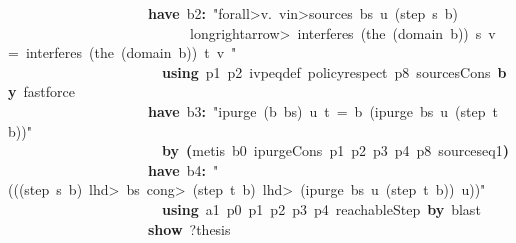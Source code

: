 \documentclass{article}
\newcommand{\syntaxKEYWORDA}[1]{\textcolor[rgb]{0.0,0.4,0.6}{\textbf{#1}}}
\newcommand{\syntaxKEYWORDC}[1]{\textcolor[rgb]{0.0,0.6,1.0}{\textbf{#1}}}
\newcommand{\syntaxLITERALA}[1]{\textcolor[rgb]{1.0,0.0,0.8}{#1}}
\newcommand{\syntaxOPERATOR}[1]{\textcolor[rgb]{0.0,0.0,0.0}{\textbf{#1}}}
\newcommand{\syntaxKEYWORDA}[1]{\textcolor[rgb]{0.0,0.4,0.6}{\textbf{#1}}}
\newcommand{\syntaxKEYWORDC}[1]{\textcolor[rgb]{0.0,0.6,1.0}{\textbf{#1}}}
\newcommand{\syntaxLITERALA}[1]{\textcolor[rgb]{1.0,0.0,0.8}{#1}}
\newcommand{\syntaxOPERATOR}[1]{\textcolor[rgb]{0.0,0.0,0.0}{\textbf{#1}}}
\newcommand{\syntaxKEYWORDA}[1]{\textcolor[rgb]{0.0,0.4,0.6}{\textbf{#1}}}
\newcommand{\syntaxKEYWORDC}[1]{\textcolor[rgb]{0.0,0.6,1.0}{\textbf{#1}}}
\newcommand{\syntaxLITERALA}[1]{\textcolor[rgb]{1.0,0.0,0.8}{#1}}
\newcommand{\syntaxOPERATOR}[1]{\textcolor[rgb]{0.0,0.0,0.0}{\textbf{#1}}}
\newcommand{\syntaxKEYWORDA}[1]{\textcolor[rgb]{0.0,0.4,0.6}{#1}}
\newcommand{\syntaxKEYWORDC}[1]{\textcolor[rgb]{0.0,0.6,1.0}{#1}}
\newcommand{\syntaxLITERALA}[1]{\textcolor[rgb]{1.0,0.0,0.8}{\textbf{#1}}}
\newcommand{\syntaxOPERATOR}[1]{\textcolor[rgb]{0.0,0.0,0.0}{#1}}
\newcommand{\syntaxKEYWORDA}[1]{\textcolor[rgb]{0.0,0.4,0.6}{\textbf{#1}}}
\newcommand{\syntaxKEYWORDC}[1]{\textcolor[rgb]{0.0,0.6,1.0}{\textbf{#1}}}
\newcommand{\syntaxLITERALA}[1]{\textcolor[rgb]{1.0,0.0,0.8}{#1}}
\newcommand{\syntaxOPERATOR}[1]{\textcolor[rgb]{0.0,0.0,0.0}{\textbf{#1}}}
\newcommand{\syntaxKEYWORDA}[1]{\textcolor[rgb]{0.0,0.4,0.6}{\textbf{#1}}}
\newcommand{\syntaxKEYWORDC}[1]{\textcolor[rgb]{0.0,0.6,1.0}{\textbf{#1}}}
\newcommand{\syntaxLITERALA}[1]{\textcolor[rgb]{1.0,0.0,0.8}{#1}}
\newcommand{\syntaxOPERATOR}[1]{\textcolor[rgb]{0.0,0.0,0.0}{\textbf{#1}}}
\begin{document}
{\ }{\ }{\ }{\ }{\ }{\ }{\ }{\ }{\ }{\ }{\ }{\ }{\ }{\ }{\ }{\ }{\ }{\ }{\ }{\ }\syntaxKEYWORDA{have}{\ }b2\syntaxOPERATOR{:}{\ }\syntaxLITERALA{"\<forall>v.{\ }v\<in>sources{\ }bs{\ }u{\ }(step{\ }s{\ }b){\ }}\hspace*{\fill}\\
\syntaxLITERALA{{\ }{\ }{\ }{\ }{\ }{\ }{\ }{\ }{\ }{\ }{\ }{\ }{\ }{\ }{\ }{\ }{\ }{\ }{\ }{\ }{\ }{\ }{\ }{\ }{\ }{\ }\<longrightarrow>{\ }interferes{\ }(the{\ }(domain{\ }b)){\ }s{\ }v{\ }={\ }interferes{\ }(the{\ }(domain{\ }b)){\ }t{\ }v{\ }"}\hspace*{\fill}\\
{\ }{\ }{\ }{\ }{\ }{\ }{\ }{\ }{\ }{\ }{\ }{\ }{\ }{\ }{\ }{\ }{\ }{\ }{\ }{\ }{\ }{\ }\syntaxKEYWORDA{using}{\ }p1{\ }p2{\ }ivpeq\usebox{\underscorebox}def{\ }policy\usebox{\underscorebox}respect{\ }p8{\ }sources\usebox{\underscorebox}Cons{\ }\syntaxKEYWORDA{by}{\ }fastforce\hspace*{\fill}\\
{\ }{\ }{\ }{\ }{\ }{\ }{\ }{\ }{\ }{\ }{\ }{\ }{\ }{\ }{\ }{\ }{\ }{\ }{\ }{\ }\syntaxKEYWORDA{have}{\ }b3\syntaxOPERATOR{:}{\ }\syntaxLITERALA{"ipurge{\ }(b{\ }\usebox{\hashbox}{\ }bs){\ }u{\ }t{\ }={\ }b{\ }\usebox{\hashbox}{\ }(ipurge{\ }bs{\ }u{\ }(step{\ }t{\ }b))"}\hspace*{\fill}\\
{\ }{\ }{\ }{\ }{\ }{\ }{\ }{\ }{\ }{\ }{\ }{\ }{\ }{\ }{\ }{\ }{\ }{\ }{\ }{\ }{\ }{\ }\syntaxKEYWORDA{by}{\ }\syntaxOPERATOR{(}metis{\ }b0{\ }ipurge\usebox{\underscorebox}Cons{\ }p1{\ }p2{\ }p3{\ }p4{\ }p8{\ }sources\usebox{\underscorebox}eq1\syntaxOPERATOR{)}\hspace*{\fill}\\
{\ }{\ }{\ }{\ }{\ }{\ }{\ }{\ }{\ }{\ }{\ }{\ }{\ }{\ }{\ }{\ }{\ }{\ }{\ }{\ }\syntaxKEYWORDA{have}{\ }b4\syntaxOPERATOR{:}{\ }\syntaxLITERALA{"(((step{\ }s{\ }b){\ }\<lhd>{\ }bs{\ }\<cong>{\ }(step{\ }t{\ }b){\ }\<lhd>{\ }(ipurge{\ }bs{\ }u{\ }(step{\ }t{\ }b)){\ }\usebox{\atbox}{\ }u))"}\hspace*{\fill}\\
{\ }{\ }{\ }{\ }{\ }{\ }{\ }{\ }{\ }{\ }{\ }{\ }{\ }{\ }{\ }{\ }{\ }{\ }{\ }{\ }{\ }{\ }\syntaxKEYWORDA{using}{\ }a1{\ }p0{\ }p1{\ }p2{\ }p3{\ }p4{\ }reachableStep{\ }\syntaxKEYWORDA{by}{\ }blast\hspace*{\fill}\\
{\ }{\ }{\ }{\ }{\ }{\ }{\ }{\ }{\ }{\ }{\ }{\ }{\ }{\ }{\ }{\ }{\ }{\ }{\ }{\ }\syntaxKEYWORDC{show}{\ }?thesis\hspace*{\fill}\\
\end{document}
